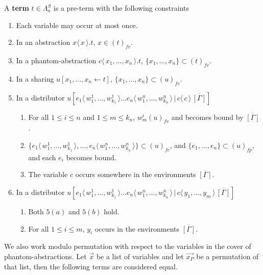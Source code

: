 \documentclass[a4paper,UKenglish,cleveref, autoref]{lipics-v2019}
\newcommand\defn{\textbf}
\newcommand{\FALC}{\Lambda^{S}_{a}}
\newcommand{\fv}[1]{(#1)_{fv}}
\newcommand{\fp}[1]{(#1)_{fp}}
\newcommand{\fc}[1]{(#1)_{fc}}
\newcommand{\set}[1]{ \{ #1 \} }
\newcommand{\fake}[3]{#1 \langle \, #2 \, \rangle . #3}
\newcommand{\share}[3]{#1 [#2 \leftarrow #3]}
\newcommand{\dist}[5]{#1 [ #2 \, \vert \, \fakedist{#4}{#5} \, #3 ]}
\newcommand{\fakedist}[2]{#1 \langle \, #2 \, \rangle}
\begin{document}
\begin{definition}[Terms]
\label{def:falcterms}
A \defn{term} $t \in \FALC$ is a pre-term with the following constraints
\begin{enumerate}
	\item  Each variable may occur at most once.
	\item In an abstraction $\fake{x}{x}{t}$, $x \in \fv{t}$.
	\item In a phantom-abstraction $\fake{c}{x_{1}, \dots, x_{n}}{t}$, $\set{x_{1}, \dots, x_{n}} \subset \fv{t}$.
	\item  In a sharing $\share{u}{x_{1}, \dots, x_{n}}{t}$, $\set{x_{1}, \dots, x_{n}} \subset \fv{u}$.
	\item  In a distributor $\dist{u}{\fakedist{e_{1}}{w^{1}_{1}, \dots, w^{1}_{k_{1}}} \dots \fakedist{e_{n}}{w^{n}_{1}, \dots, w^{n}_{k_{n}}}}{\overline{[\Gamma]}}{c}{c}$
	\begin{enumerate}
		\item For all $1 \leq i \leq n$ and $1 \leq m \leq k_{n}$, $w^{i}_{m} \fv{u}$ and becomes bound by $\overline{[\Gamma]}$ .
		\item $\set{\fakedist{e_{1}}{w^{1}_{1}, \dots, w^{1}_{k_{1}}}, \dots, \fakedist{e_{n}}{w^{n}_{1}, \dots, w^{n}_{k_{n}}}} \subset \fc{u}$, and $\set{e_{1}, \dots, e_{n}} \subset \fp{u}$, and each $e_{i}$ becomes bound.
		\item The variable $c$ occurs somewhere in the environments $\overline{[\Gamma]}$.
	\end{enumerate}
	\item  In a distributor $\dist{u}{\fakedist{e_{1}}{w^{1}_{1}, \dots, w^{1}_{k_{1}}} \dots \fakedist{e_{n}}{w^{n}_{1}, \dots, w^{n}_{k_{n}}}}{\overline{[\Gamma]}}{c}{y_{1}, \dots, y_{m}}$
	\begin{enumerate}
		\item Both $5(a)$ and $5(b)$ hold.
		\item For all $1 \leq i \leq m$, $y_{i}$ occurs in the environments $\overline{[\Gamma]}$.
	\end{enumerate}
\end{enumerate}

\end{definition}

We also work modulo permutation with respect to the variables in the cover of phantom-abstractions. Let $\vec{x}$ be a list of variables and let $\vec{x_{P}}$ be a permutation of that list, then the following terms are considered equal.
\end{document}
